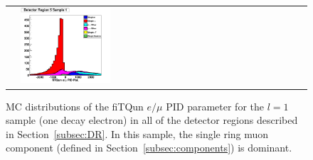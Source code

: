 \begin{figure}[h!]
\begin{tabular}{l  l  l}
  &\includegraphics[width=0.33\textwidth]{plots/mc_breakdown_comp_1_bin_5_att_0} 
\end{tabular} 
\caption{MC distributions of the fiTQun $e/\mu$ PID parameter for the $l = 1$
sample (one decay electron) in all of the detector regions described in
Section~\ref{subsec:DR}.  In this sample, the single ring muon 
component (defined in Section~\ref{subsec:components}) is dominant.}
\label{fig:samplot1}
\end{figure}

